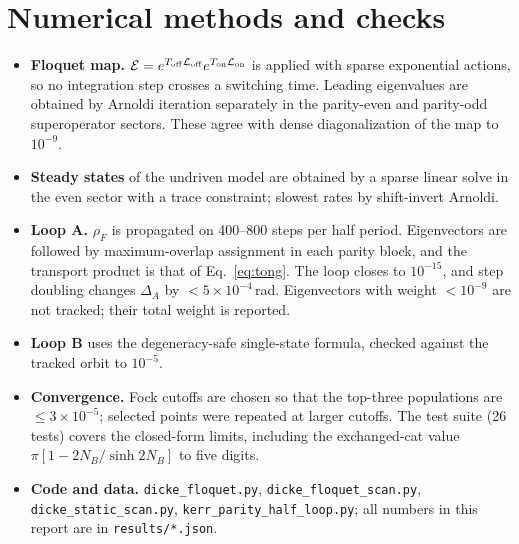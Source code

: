 \documentclass[11pt,a4paper]{article}
\newcommand{\Lio}{\mathcal{L}}
\newcommand{\E}{\mathcal{E}}
\begin{document}
\appendix
\section{Numerical methods and checks}\label{app:numerics}

\begin{itemize}
\item \textbf{Floquet map.} $\E=e^{T_{\rm off}\Lio_{\rm off}}e^{T_{\rm on}\Lio_{\rm on}}$ is applied
  with sparse exponential actions, so no integration step crosses a switching time. Leading
  eigenvalues are obtained by Arnoldi iteration separately in the parity-even and parity-odd
  superoperator sectors. These agree with dense diagonalization of the map to $10^{-9}$.
\item \textbf{Steady states} of the undriven model are obtained by a sparse linear solve in the even
  sector with a trace constraint; slowest rates by shift-invert Arnoldi.
\item \textbf{Loop A.} $\rho_F$ is propagated on 400–800 steps per half period. Eigenvectors are
  followed by maximum-overlap assignment in each parity block, and the transport product is that of
  Eq.~\eqref{eq:tong}. The loop closes to $10^{-15}$, and step doubling changes $\Delta_A$ by
  $<5\times10^{-4}$\,rad. Eigenvectors with weight $<10^{-9}$ are not tracked; their total weight is
  reported.
\item \textbf{Loop B} uses the degeneracy-safe single-state formula, checked against the tracked
  orbit to $10^{-5}$.
\item \textbf{Convergence.} Fock cutoffs are chosen so that the top-three populations are
  $\le3\times10^{-5}$; selected points were repeated at larger cutoffs. The test suite (26 tests)
  covers the closed-form limits, including the exchanged-cat value $\pi[1-2N_B/\sinh2N_B]$ to five
  digits.
\item \textbf{Code and data.} \texttt{dicke\_floquet.py}, \texttt{dicke\_floquet\_scan.py},
  \texttt{dicke\_static\_scan.py}, \texttt{kerr\_parity\_half\_loop.py}; all numbers in this report
  are in \texttt{results/*.json}.
\end{itemize}
\end{document}
